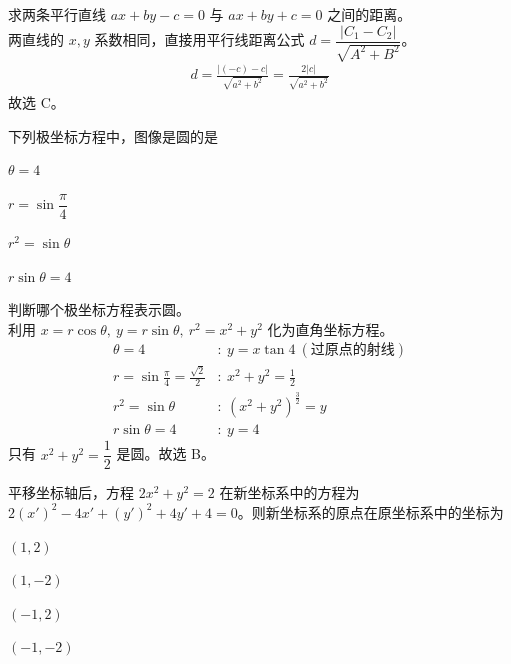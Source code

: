 \begin{solution}
    求两条平行直线 $ax+by-c=0$ 与 $ax+by+c=0$ 之间的距离。\\
    两直线的 $x,y$ 系数相同，直接用平行线距离公式 $d=\dfrac{|C_1-C_2|}{\sqrt{A^2+B^2}}$。\\
    \begin{align*}
        d=\frac{|(-c)-c|}{\sqrt{a^2+b^2}}=\frac{2|c|}{\sqrt{a^2+b^2}}
    \end{align*}
    故选 C。
\end{solution}

\begin{question}
    下列极坐标方程中，图像是圆的是 \paren[B]
    \begin{choices}
        \item $\theta=4$
        \item $r=\sin\dfrac{\pi}{4}$
        \item $r^2=\sin\theta$
        \item $r\sin\theta=4$
    \end{choices}
\end{question}

\begin{solution}
    判断哪个极坐标方程表示圆。\\
    利用 $x=r\cos\theta,\ y=r\sin\theta,\ r^2=x^2+y^2$ 化为直角坐标方程。\\
    \begin{align*}
        \theta=4 &:\ y=x\tan 4\ (\text{过原点的射线}) \\
        r=\sin\frac{\pi}{4}=\frac{\sqrt2}{2} &:\ x^2+y^2=\frac12 \\
        r^2=\sin\theta &:\ (x^2+y^2)^{\frac32}=y \\
        r\sin\theta=4 &:\ y=4
    \end{align*}
    只有 $x^2+y^2=\dfrac12$ 是圆。故选 B。
\end{solution}

\begin{question}
    平移坐标轴后，方程 $2x^2+y^2=2$ 在新坐标系中的方程为 $2(x')^2-4x'+(y')^2+4y'+4=0$。则新坐标系的原点在原坐标系中的坐标为 \paren[C]
    \begin{choices}
        \item $(1,2)$
        \item $(1,-2)$
        \item $(-1,2)$
        \item $(-1,-2)$
    \end{choices}
\end{question}

